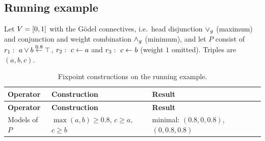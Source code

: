 \subsection*{Running example}
Let $V=[0,1]$ with the Gödel connectives, i.e.\ head disjunction $\lor_g$ (maximum) and conjunction and weight combination $\land_g$ (minimum), and let $P$ consist of $r_1:\ a\lor b\overset{0.8}{\gets}\top$, $r_2:\ c\flpif{}a$ and $r_3:\ c\flpif{}b$ (weight $1$ omitted). Triples are $(a,b,c)$.

    {\scriptsize
        \renewcommand{\arraycolsep}{2pt}
        \begin{longtable}{@{}p{}p{}p{}@{}}
            \caption{Fixpoint constructions on the running example.}\label{tab:example}                                                                                                                                                                                                                                                                                                                                                                \\
            \toprule
            \textbf{Operator}                                                                                                                                                                    & \textbf{Construction}                                                                                                                                         & \textbf{Result}                                                                     \\
            \midrule\endfirsthead
            \toprule
            \textbf{Operator}                                                                                                                                                                    & \textbf{Construction}                                                                                                                                         & \textbf{Result}                                                                     \\
            \midrule\endhead
            \bottomrule\endfoot
            Models of $P$                                                                                                                                                                        & $\max(a,b)\geq0.8$, $c\geq a$, $c\geq b$                                                                                                                      & minimal: $(0.8,0,0.8)$, $(0,0.8,0.8)$                                               \\

\end{longtable}}
